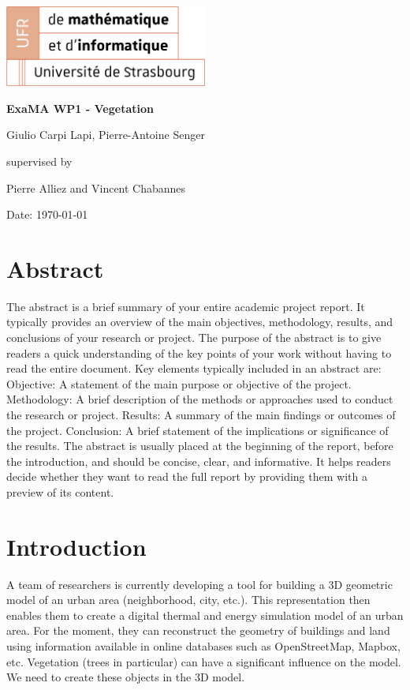 \documentclass[12pt]{article}
\begin{document}
\begin{titlepage}
    \centering
    \includegraphics[width=0.5\textwidth]{images/logo_ufr.png}\par\vspace{1cm}
    \vspace{1.5cm}
    {\huge\bfseries ExaMA WP1 - Vegetation\par}
    \vspace{2cm}
    {\Large Giulio Carpi Lapi, Pierre-Antoine Senger\par}
    \vfill
    supervised by\par
    Pierre Alliez and Vincent Chabannes

    \vfill

    {\large Date: \today\par}
\end{titlepage}

\tableofcontents
\newpage

\section{Abstract}
The abstract is a brief summary of your entire academic project report.
It typically provides an overview of the main objectives, methodology, results, and conclusions of your research or project.
The purpose of the abstract is to give readers a quick understanding of the key points of your work without having to read the entire document.
Key elements typically included in an abstract are:
Objective: A statement of the main purpose or objective of the project.
Methodology: A brief description of the methods or approaches used to conduct the research or project.
Results: A summary of the main findings or outcomes of the project.
Conclusion: A brief statement of the implications or significance of the results.
The abstract is usually placed at the beginning of the report, before the introduction, and should be concise, clear, and informative.
It helps readers decide whether they want to read the full report by providing them with a preview of its content.

\section{Introduction}
A team of researchers is currently developing a tool for building a 3D geometric model of an urban area (neighborhood, city, etc.).
This representation then enables them to create a digital thermal and energy simulation model of an urban area.
For the moment, they can reconstruct the geometry of buildings and land using information available in online databases such as OpenStreetMap, Mapbox, etc.
Vegetation (trees in particular) can have a significant influence on the model. We need to create these objects in the 3D model.
\end{document}
